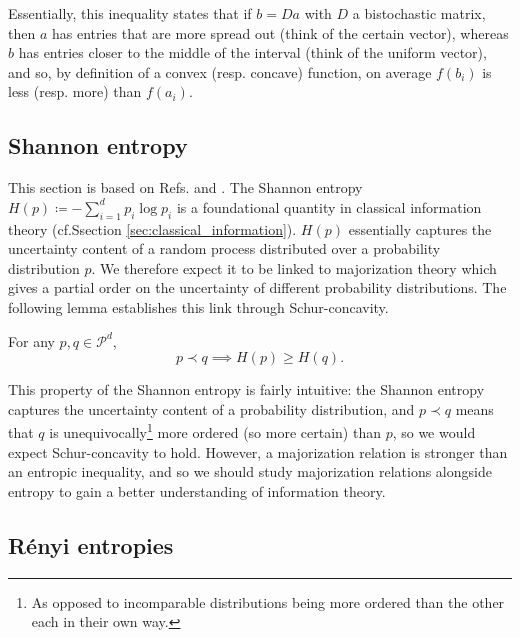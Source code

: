 Essentially, this inequality states that if $b = Da$ with $D$ a bistochastic matrix, then $a$ has entries that are more spread out (think of the certain vector), whereas $b$ has entries closer to the middle of the interval (think of the uniform vector), and so, by definition of a convex (resp. concave) function, on average $f(b_i)$ is less (resp. more) than $f(a_i)$.



\subsection{Shannon entropy} \label{sec:schur_shannon}

This section is based on Refs. \cite[p. 101]{marshall_inequalities_2011} and \cite[p. 88]{cover_elements_2006}. %
The Shannon entropy $H(p) \coloneqq - \sum_{i = 1}^{d} p_i \log p_i$ is a foundational quantity in classical information theory (cf.Ssection \ref{sec:classical_information}). $H(p)$ essentially captures the uncertainty content of a random process distributed over a probability distribution $p$. We therefore expect it to be linked to majorization theory which gives a partial order on the uncertainty of different probability distributions. The following lemma establishes this link through Schur-concavity.

\begin{lemma}
    For any $p, q \in \mathcal{P}^d$,
    \begin{equation}
        p \prec q \implies  H(p) \geq H(q).
    \end{equation}
\end{lemma}

This property of the Shannon entropy is fairly intuitive: the Shannon entropy captures the uncertainty content of a probability distribution, and $p \prec q$ means that $q$ is unequivocally\footnote{As opposed to incomparable distributions being more ordered than the other each in their own way.} more ordered (so more certain) than $p$, so we would expect Schur-concavity to hold. However, a majorization relation is stronger than an entropic inequality, and so we should study majorization relations alongside entropy to gain a better understanding of information theory.

\subsection{Rényi entropies}

